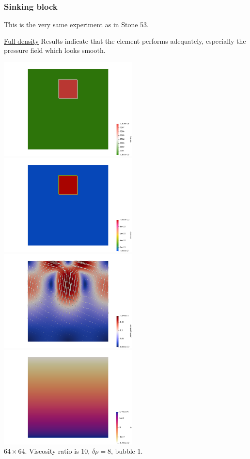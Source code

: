\subsubsection*{Sinking block}

This is the very same experiment as in Stone 53.

\underline{Full density} 
Results indicate that the element performs adequately, especially the 
pressure field which looks smooth.  

\begin{center}
\includegraphics[width=7cm]{python_codes/fieldstone_72/results/block/full/density}
\includegraphics[width=7cm]{python_codes/fieldstone_72/results/block/full/viscosity}\\
\includegraphics[width=7cm]{python_codes/fieldstone_72/results/block/full/vel}
\includegraphics[width=7cm]{python_codes/fieldstone_72/results/block/full/p}\\
{\captionfont $64\times 64$. Viscosity ratio is 10, $\delta \rho=8$, bubble 1.}
\end{center}


